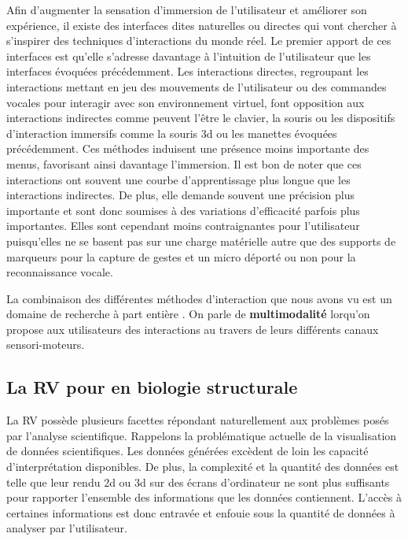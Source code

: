 Afin d'augmenter la sensation d'immersion de l'utilisateur et améliorer son expérience, il existe des interfaces dites naturelles ou directes qui vont chercher à s'inspirer des techniques d'interactions du monde réel. Le premier apport de ces interfaces est qu'elle s'adresse davantage à l'intuition de l'utilisateur que les interfaces évoquées précédemment.
Les interactions directes, regroupant les interactions mettant en jeu des mouvements de l'utilisateur ou des commandes vocales pour interagir avec son environnement virtuel, font opposition aux interactions indirectes comme peuvent l'être le clavier, la souris ou les dispositifs d'interaction immersifs comme la souris 3d ou les manettes évoquées précédemment. Ces méthodes induisent une présence moins importante des menus, favorisant ainsi davantage l'immersion. Il est bon de noter que ces interactions ont souvent une courbe d'apprentissage plus longue que les interactions indirectes. De plus, elle demande souvent une précision plus importante et sont donc soumises à des variations d'efficacité parfois plus importantes. Elles sont cependant moins contraignantes pour l'utilisateur puisqu'elles ne se basent pas sur une charge matérielle autre que des supports de marqueurs pour la capture de gestes et un micro déporté ou non pour la reconnaissance vocale.

La combinaison des différentes méthodes d'interaction que nous avons vu est un domaine de recherche à part entière \cite{martin_hardware_2014,martin_reconfigurable_2011}. On parle de \textbf{multimodalité} lorqu'on propose aux utilisateurs des interactions au travers de leurs différents canaux sensori-moteurs.

\subsection{La RV pour en biologie structurale}

La RV possède plusieurs facettes répondant naturellement aux problèmes posés par l'analyse scientifique. Rappelons la problématique actuelle de la visualisation de données scientifiques. Les données générées excèdent de loin les capacité d'interprétation disponibles. De plus, la complexité et la quantité des données est telle que leur rendu 2d ou 3d sur des écrans d'ordinateur ne sont plus suffisants pour rapporter l'ensemble des informations que les données contiennent. L'accès à certaines informations est donc entravée et enfouie sous la quantité de données à analyser par l'utilisateur.

